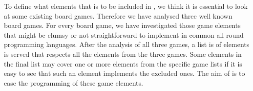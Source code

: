 To define what elements that is to be included in \productname{}, we think it is essential to look at some existing board games. Therefore we have analysed three well known board games. For every board game, we have investigated those game elements that
might be clumsy or not straightforward to implement in common all round programming languages. After the analysis of all three games, a list is of elements is served that respects all the elements from the three games. Some elements in the final list may cover one or more elements from the specific game lists if it is easy to see that such an element implements the excluded ones. The aim of \productname{} is to ease the programming of these game elements.
